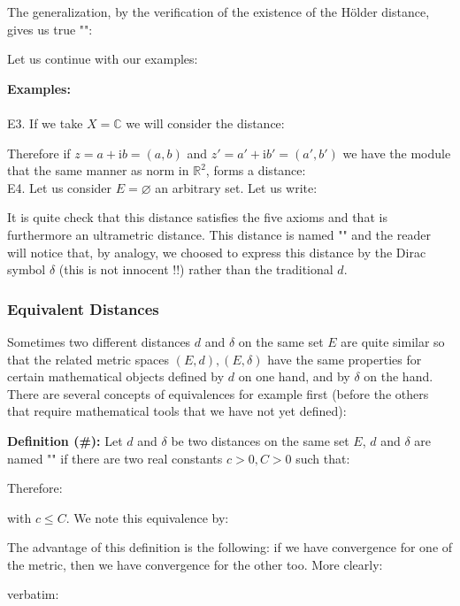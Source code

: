 	The generalization, by the verification of the existence of the Hölder distance, gives us true "":
		

	Let us continue with our examples:
	\begin{tcolorbox}[colframe=black,colback=white,sharp corners]
	\textbf{{\Large {}}Examples:}\\\\
	E3. If we take $X=\mathbb{C}$ we will consider the distance:
	
	Therefore if $z=a+\mathrm{i}b=(a,b)$ and $z'=a'+\mathrm{i}b'=(a',b')$ we have the module that the same manner as norm in $\mathbb{R}^2$, forms a distance:
	\\
	
	E4. Let us consider $E=\varnothing$ an arbitrary set. Let us write:
	
	It is quite check that this distance satisfies the five axioms and that is furthermore an ultrametric distance. This distance is named "" and the reader will notice that, by analogy, we choosed to express this distance by the Dirac symbol $\delta$ (this is not innocent !!) rather than the traditional $d$.
	\end{tcolorbox}
	
	\pagebreak
	\subsubsection{Equivalent Distances}
	Sometimes two different distances $d$ and $\delta$ on the same set $E$ are quite similar so that the related metric spaces $(E,d),(E,\delta)$ have the same properties for certain mathematical objects defined by $d$ on one hand, and by $\delta$ on the hand. There are several concepts of equivalences for example first (before the others that require mathematical tools that we have not yet defined):

	\textbf{Definition (\#\mydef):} Let $d$ and $\delta$ be two distances on the same set $E$, $d$ and $\delta$ are named "" if there are two real constants $c>0,C>0$ such that:
	
	Therefore:
	
	with $c\leq C$. We note this equivalence by:
	
	The advantage of this definition is the following: if we have convergence for one of the metric, then we have convergence for the other too. More clearly:
	
	verbatim:
	
